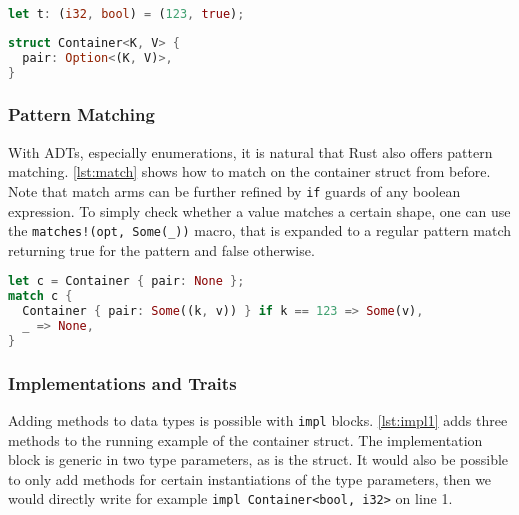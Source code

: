 \noindent\begin{minipage}[t]{.45\textwidth}
\begin{lstlisting}[language=Rust, style=short, caption={A two-tuple in Rust.}, label=lst:tuples]
let t: (i32, bool) = (123, true);
\end{lstlisting}
\end{minipage}\hfill
\begin{minipage}[t]{.45\textwidth}
\begin{lstlisting}[language=Rust, style=short, label={lst:container}, caption={The struct for the running example.}]
struct Container<K, V> {
  pair: Option<(K, V)>,
}
\end{lstlisting}
\end{minipage}

\subsubsection{Pattern Matching}

With ADTs, especially enumerations, it is natural that Rust also offers pattern
matching. \autoref{lst:match} shows how to match on the container struct from
before. Note that match arms can be further refined by \lstinline!if! guards of
any boolean expression. To simply check whether a value matches a certain shape,
one can use the \lstinline"matches!(opt, Some(_))" macro, that is expanded to a
regular pattern match returning true for the pattern  and false otherwise.

\begin{lstlisting}[language=Rust, caption={Pattern matching on a struct.}, label=lst:match]
let c = Container { pair: None };
match c {
  Container { pair: Some((k, v)) } if k == 123 => Some(v),
  _ => None,
}
\end{lstlisting}

\subsubsection{Implementations and Traits}

Adding methods to data types is possible with \lstinline!impl! blocks.
\autoref{lst:impl1} adds three methods to the running example of the container
struct. The implementation block is generic in two type parameters, as is the
struct.  It would also be possible to only add methods for certain
instantiations of the  type parameters, then we would directly write for example
\lstinline!impl Container<bool, i32>! on line 1.

